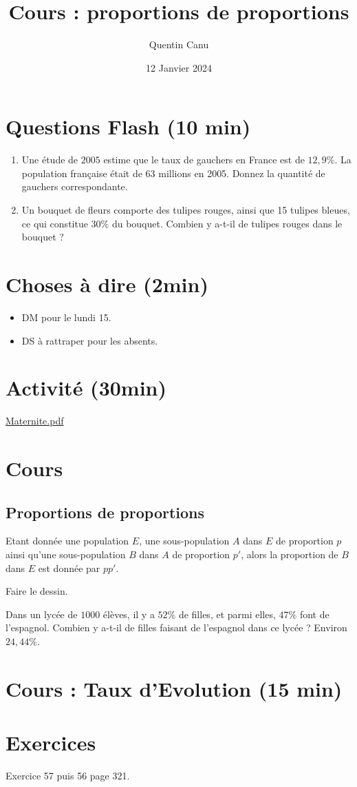 \documentclass{article}
\title{Cours : proportions de proportions}
\author{Quentin Canu}
\date{12 Janvier 2024}
\begin{document}
\maketitle
\section{Questions Flash (10 min)}
\begin{enumerate}
\item Une étude de $2005$ estime que le taux de gauchers en France est de $12,9\%$. La population française était de $63$ millions en 2005. Donnez la quantité de gauchers correspondante.
\item Un bouquet de fleurs comporte des tulipes rouges, ainsi que 15 tulipes bleues, ce qui constitue $30\%$ du bouquet. Combien y a-t-il de tulipes rouges dans le bouquet ?
\end{enumerate}
\section{Choses à dire (2min)}
\begin{itemize}
\item DM pour le lundi 15.
\item DS à rattraper pour les absents.
\end{itemize}
\section{Activité (30min)}
\url{Maternite.pdf}
\section{Cours}
\subsection*{Proportions de proportions}
\begin{proposition}
Etant donnée une population $E$, une sous-population $A$ dans $E$ de proportion $p$ ainsi qu'une sous-population $B$ dans $A$ de proportion $p'$, alors la proportion de $B$ dans $E$ est donnée par $pp'$.
\end{proposition}
Faire le dessin.
\begin{example}
Dans un lycée de $1000$ élèves, il y a $52\%$ de filles, et parmi elles, $47\%$ font de l'espagnol. Combien y a-t-il de filles faisant de l'espagnol dans ce lycée ? Environ $24,44\%$.    
\end{example}
\section{Cours : Taux d'Evolution (15 min)}

\section{Exercices}
Exercice 57 puis 56 page 321. 
\end{document}
